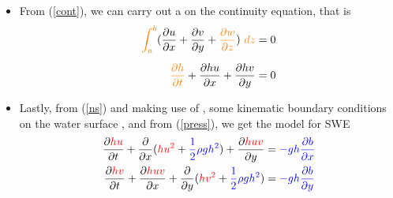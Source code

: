 \begin{frame}
\vspace{-3mm}
\begin{itemize}
\item<1-> From (\ref{cont}), we can carry out a  on the continuity equation, that is 
\begin{align}
\textcolor{orange}{\int_a^b} (\frac{\partial u}{\partial x} + \frac{\partial v}{\partial y} + \textcolor{orange}{\frac{\partial w}{\partial z}})\ \textcolor{orange}{dz} &= 0 \nonumber \\[0.2cm]
\textcolor{orange}{\frac{\partial h}{\partial t}} + \frac{\partial hu}{\partial x} + \frac{\partial hv}{\partial y} &= 0
\end{align}
\item<2-> Lastly, from (\ref{ns}) and making use of , some kinematic boundary conditions on the water surface \cite{depthAv}, and from (\ref{press}), we get the model for SWE
\begin{align}
\frac{\partial \textcolor{red}{hu}}{\partial t} + \frac{\partial}{\partial x}(\textcolor{red}{hu^2} + \textcolor{blue}{\frac{1}{2}\rho g h^2}) + \frac{\partial \textcolor{red}{huv}}{\partial y} &= \textcolor{blue}{- gh\frac{\partial b}{\partial x}} \\
\frac{\partial \textcolor{red}{hv}}{\partial t} + \frac{\partial \textcolor{red}{huv}}{\partial x} + \frac{\partial}{\partial y}(\textcolor{red}{hv^2} + \textcolor{blue}{\frac{1}{2}\rho g h^2})&= \textcolor{blue}{- gh\frac{\partial b}{\partial y} }
\end{align}
\end{itemize}
\end{frame}
\clearpage


